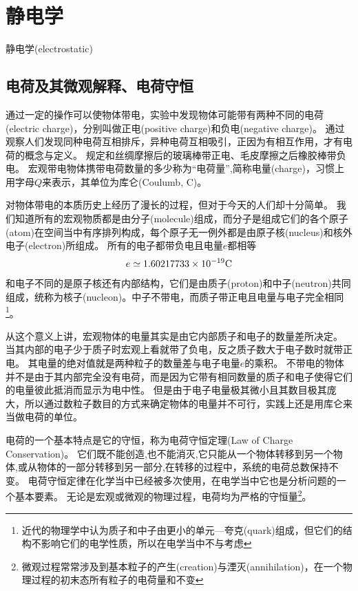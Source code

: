 
\chapter{静电学}
{\heiti 静电学}(electrostatic)

\section{电荷及其微观解释、电荷守恒}

通过一定的操作可以使物体带电，实验中发现物体可能带有两种不同的{\heiti 电荷}(electric charge)，分别叫做{\heiti 正电}(positive charge)和{\heiti 负电}(negative charge)。
通过观察人们发现同种电荷互相排斥，异种电荷互相吸引，正因为有相互作用，才有电荷的概念与定义。
规定和丝绸摩擦后的玻璃棒带正电、毛皮摩擦之后橡胶棒带负电。
宏观带电物体携带电荷数量的多少称为“电荷量”,简称{\heiti 电量}(charge)，习惯上用字母$Q$来表示，其单位为{\heiti 库仑}(Coulumb, C)。

对物体带电的本质历史上经历了漫长的过程，但对于今天的人们却十分简单。
我们知道所有的宏观物质都是由{\heiti 分子}(molecule)组成，而分子是组成它们的各个{\heiti 原子}(atom)在空间当中有序排列构成，每个原子无一例外都是由{\heiti 原子核}(nucleus)和核外{\heiti 电子}(electron)所组成。
所有的电子都带负电且电量$e$都相等
\begin{equation}
e\simeq 1.60217733\times 10^{-19}{\rm{C}}
\end{equation}
和电子不同的是原子核还有内部结构，它们是由{\heiti 质子}(proton)和{\heiti 中子}(neutron)共同组成，统称为{\heiti 核子}(nucleon)。中子不带电，而质子带正电且电量与电子完全相同\footnote{近代的物理学中认为质子和中子由更小的单元---{\heiti 夸克}(quark)组成，但它们的结构不影响它们的电学性质，所以在电学当中不与考虑}。

从这个意义上讲，宏观物体的电量其实是由它内部质子和电子的数量差所决定。
当其内部的电子少于质子时宏观上看就带了负电，反之质子数大于电子数时就带正电。
其电量的绝对值就是两种粒子的数量差与电子电量$e$的乘积。
不带电的物体并不是由于其内部完全没有电荷，而是因为它带有相同数量的质子和电子使得它们的电量彼此抵消而显示为电中性。
但是由于电子电量极其微小且其数目极其庞大，所以通过数粒子数目的方式来确定物体的电量并不可行，实践上还是用库仑来当做电荷的单位。

电荷的一个基本特点是它的守恒，称为{\heiti 电荷守恒定理}(Law of Charge Conservation)。
它们既不能创造,也不能消灭,它只能从一个物体转移到另一个物体,或从物体的一部分转移到另一部分,在转移的过程中，系统的电荷总数保持不变。
电荷守恒定律在化学当中已经被多次使用，在电学当中它也是分析问题的一个基本要素。
无论是宏观或微观的物理过程，电荷均为严格的守恒量\footnote{微观过程常常涉及到基本粒子的{\heiti 产生}(creation)与{\heiti 湮灭}(annihilation)，在一个物理过程的初末态所有粒子的电荷量和不变}。

